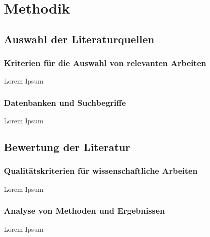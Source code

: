 \section{Methodik}
\subsection{Auswahl der Literaturquellen}
\subsubsection{Kriterien für die Auswahl von relevanten Arbeiten}
Lorem Ipsum

\subsubsection{Datenbanken und Suchbegriffe}
Lorem Ipsum

\subsection{Bewertung der Literatur}
\subsubsection{Qualitätskriterien für wissenschaftliche Arbeiten}
Lorem Ipsum

\subsubsection{Analyse von Methoden und Ergebnissen}
Lorem Ipsum
